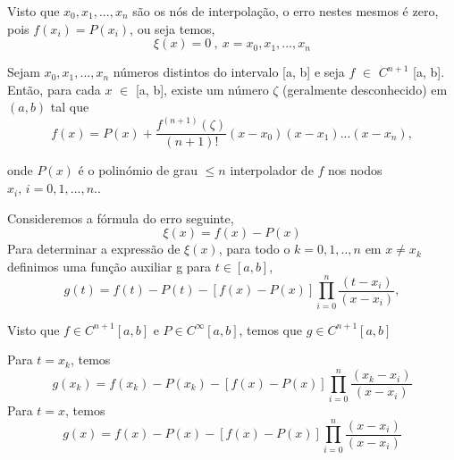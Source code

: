 \documentclass[12pt]{article}
\begin{document}
     \hspace{0.5cm}Visto que ${x_{0}}, {x_{1}}, ..., {x_{n}} $ são os nós de interpolação, o erro nestes mesmos é zero, pois $f(x_{i})=P(x_{i})$, ou seja temos,
    \begin{equation}
    \xi(x)=0\ , \ x=x_{0},{x_{1}}, ..., {x_{n}}
    \end{equation}

   
    \hspace{0.5cm}Sejam $x_{0}, {x_{1}}, ..., {x_{n}}$ números distintos do intervalo [a, b] e seja $f$ $\in$ $C^{n+1}$ [a, b]. Então, para cada $x$ $\in$  [a, b], existe um número $\zeta$ (geralmente desconhecido) em $(a, b)$ tal que
    \begin{equation}
    f (x)= P(x)+\frac{f^{(n+1)}(\zeta)}{(n+1)!}{(x-{x_{0}})(x-x_{1})...(x-x_{n})},
    \end{equation}
   
    \hspace{0.5cm}onde $P(x)$ é o polinómio de grau $\leq n$ interpolador de $f$ nos nodos $x_i,\, i=0,1,...,n.$.

    \hspace{0.5cm}Consideremos a fórmula do erro seguinte,
    \begin{equation}
    \xi(x)=f(x)-P(x)
    \end{equation}
    \hspace{0.5cm}Para determinar a expressão de $\xi(x)$, para todo o $k = 0,1,..,n$ em $x \neq x_{k}$ definimos uma função auxiliar g para $t \in [a,b]$, \cite{website}
    \begin{equation}
    g(t) = f(t)-P(t)- [f(x)-P(x)] \prod_{i=0}^{n} \frac{(t-x_{i})}{(x-x_{i})},
    \end{equation}

    \hspace{0.5cm}Visto que $f \in C^{n+1}[a,b]$ e $P \in C^{\infty}[a,b]$, temos que $g \in C^{n+1}[a,b]$
   
    \hspace{0.5cm}Para $t=x_{k}$, temos
    \begin{equation}
        g(x_{k})= f(x_{k})-P(x_{k})- [f(x)-P(x)] \prod_{i=0}^{n} \frac{(x_{k}-x_{i})}{(x-x_{i})}
    \end{equation}
    \hspace{0.5cm}Para $t=x$, temos
    \begin{equation}
        g(x)= f(x)-P(x)- [f(x)-P(x)] \prod_{i=0}^{n} \frac{(x-x_{i})}{(x-x_{i})}
    \end{equation}
   
\end{document}
